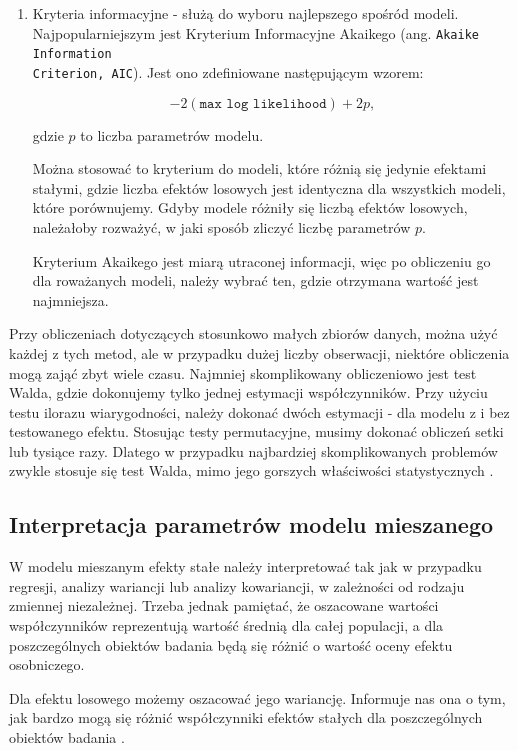 \documentclass[12pt]{mwbk}
\theoremstyle{plain}
\theoremstyle{definition}
\theoremstyle{remark}
\begin{document}
\begin{enumerate}
	\item Kryteria informacyjne - służą do wyboru najlepszego spośród modeli. Najpopularniejszym jest Kryterium Informacyjne Akaikego (ang. \texttt{Akaike Information \\Criterion, AIC}). Jest ono zdefiniowane następującym wzorem:
	
	$$-2(\texttt{max log likelihood})+ 2p,$$
	
	gdzie $p$ to liczba parametrów modelu.
	
	Można stosować to kryterium do modeli, które różnią się jedynie efektami stałymi, gdzie liczba efektów losowych jest identyczna dla wszystkich modeli, które porównujemy. Gdyby modele różniły się liczbą efektów losowych, należałoby rozważyć, w jaki sposób zliczyć liczbę parametrów $p$.
	
	Kryterium Akaikego jest miarą utraconej informacji, więc po obliczeniu go dla roważanych modeli, należy wybrać ten, gdzie otrzymana wartość jest najmniejsza.

\end{enumerate}

Przy obliczeniach dotyczących stosunkowo małych zbiorów danych, można użyć każdej z tych metod, ale w przypadku dużej liczby obserwacji, niektóre obliczenia mogą zająć zbyt wiele czasu. Najmniej skomplikowany obliczeniowo jest test Walda, gdzie dokonujemy tylko jednej estymacji współczynników. Przy użyciu testu ilorazu wiarygodności, należy dokonać dwóch estymacji - dla modelu z i bez testowanego efektu. Stosując testy permutacyjne, musimy dokonać obliczeń setki lub tysiące razy. Dlatego w przypadku najbardziej skomplikowanych problemów zwykle stosuje się test Walda, mimo jego gorszych właściwości statystycznych \cite{biecek}.

\subsection{Interpretacja parametrów modelu mieszanego}
W modelu mieszanym efekty stałe należy interpretować tak jak w przypadku regresji, analizy wariancji lub analizy kowariancji, w zależności od rodzaju zmiennej niezależnej. Trzeba jednak pamiętać, że oszacowane wartości współczynników reprezentują wartość średnią dla całej populacji, a dla poszczególnych obiektów badania będą się różnić o wartość oceny efektu osobniczego.

Dla efektu losowego możemy oszacować jego wariancję. Informuje nas ona o tym, jak bardzo mogą się różnić współczynniki efektów stałych dla poszczególnych obiektów badania
\cite{experimental}.
\end{document}
